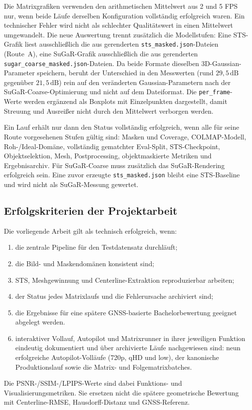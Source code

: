 Die Matrixgrafiken verwenden den arithmetischen Mittelwert aus 2 und 5 FPS nur,
wenn beide Läufe derselben Konfiguration vollständig erfolgreich waren. Ein
technischer Fehler wird nicht als schlechter Qualitätswert in einen Mittelwert
umgewandelt. Die neue Auswertung trennt zusätzlich die Modellstufen: Eine
STS-Grafik liest ausschließlich die aus  gerenderten
\texttt{sts\_masked.json}-Dateien (Route~A), eine SuGaR-Grafik ausschließlich die
aus  gerenderten \texttt{sugar\_coarse\_masked.json}-Dateien. Da
beide Formate dieselben 3D-Gaussian-Parameter speichern, beruht der Unterschied
in den Messwerten (rund $29{,}5\,\mathrm{dB}$ gegenüber $21{,}5\,\mathrm{dB}$)
rein auf den veränderten Gaussian-Parametern nach der SuGaR-Coarse-Optimierung und
nicht auf dem Dateiformat. Die \texttt{per\_frame}-Werte werden ergänzend als
Boxplots mit Einzelpunkten dargestellt, damit Streuung und Ausreißer nicht durch
den Mittelwert verborgen werden.

Ein Lauf erhält nur dann den Status vollständig erfolgreich, wenn alle für
seine Route vorgesehenen Stufen gültig sind: Masken und Coverage,
COLMAP-Modell, Roh-/Ideal-Domäne, vollständig gematchter Eval-Split,
STS-Checkpoint, Objektselektion, Mesh, Postprocessing, objektmaskierte Metriken
und Ergebnisarchiv. Für SuGaR-Coarse muss zusätzlich das SuGaR-Rendering
erfolgreich sein. Eine zuvor erzeugte \texttt{sts\_masked.json} bleibt eine
STS-Baseline und wird nicht als SuGaR-Messung gewertet.

\subsection{Erfolgskriterien der Projektarbeit}

Die vorliegende Arbeit gilt als technisch erfolgreich, wenn:

\begin{enumerate}
  \item die zentrale Pipeline für den Testdatensatz durchläuft;
  \item die Bild- und Maskendomänen konsistent sind;
  \item STS, Meshgewinnung und Centerline-Extraktion reproduzierbar arbeiten;
  \item der Status jedes Matrixlaufs und die Fehlerursache archiviert sind;
  \item die Ergebnisse für eine spätere GNSS-basierte Bachelorbewertung
        geeignet abgelegt werden.
    \item interaktiver Vollauf, Autopilot und Matrixrunner in ihrer
      jeweiligen Funktion eindeutig dokumentiert und über archivierte Läufe
      nachgewiesen sind: neun erfolgreiche Autopilot-Volläufe (720p, qHD und
      low), der kanonische Produktionslauf sowie die Matrix- und
      Folgematrixbatches.
\end{enumerate}

Die PSNR-/SSIM-/LPIPS-Werte sind dabei Funktions- und Visualisierungsmetriken.
Sie ersetzen nicht die spätere geometrische Bewertung mit Centerline-RMSE,
Hausdorff-Distanz und GNSS-Referenz.
